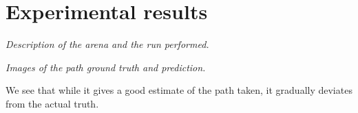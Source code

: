 
 
\section{Experimental results}
\textit{Description of the arena and the run performed.}

\textit{Images of the path ground truth and prediction.}

We see that while it gives a good estimate of the path taken, it gradually deviates from the actual truth.